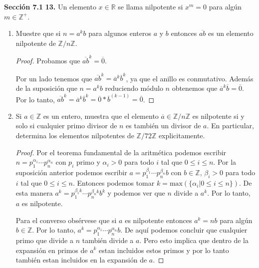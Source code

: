 \documentclass[letter,twoside,12pt]{article}
\begin{document}
\newpage
\textbf{Secci\'on 7.1} \textbf{13.} Un elemento $x \in \mathbb{R}$ se llama nilpotente si $x^m=0$ para alg\'un $m \in \mathbb{Z}^+$.
\begin{enumerate}[label=\textbf{(\alph*)}]

\item Muestre que si $n=a^kb$ para algunos enteros $a$ y $b$ entonces $\overline{ab}$ es un elemento nilpotente de $\mathbb{Z}/n\mathbb{Z}$.
\begin{proof}

Probamos que $\overline{ab}^k=\overline{0}$.

Por un lado tenemos que $\overline{ab}^k=\overline{a}^k\overline{b}^k$, ya que el anillo es conmutativo. Adem\'as de la suposici\'on que $n=a^kb$ reduciendo m\'odulo $n$ obtenemos que $\overline{a}^k\overline{b}=\overline{0}$. Por lo tanto, $\overline{ab}^k=\overline{a}^k\overline{b}^k=\overline{0}*\overline{b}^{(k-1)}= \overline{0}$.
\end{proof}
\item Si $a \in \mathbb{Z}$ es un entero, muestra que el elemento $\overline{a} \in \mathbb{Z}/n\mathbb{Z}$ es nilpotente si y solo si cualquier primo divisor de $n$ es tambi\'en un divisor de $a$. En particular, determina los elementos nilpotentes de $\mathbb{Z}/72\mathbb{Z}$ explicitamente.
\begin{proof}
Por el teorema fundamental de la aritm\'etica podemos escribir $n=p_1^{\alpha_1}\cdots p_n^{\alpha_n}$ con $p_i$ primo y $\alpha_i>0$ para todo $i$ tal que $0\leq i \leq n$. Por la suposici\'on anterior podemos escribir $a=p_1^{\beta_1}\cdots p_n^{\beta_n}b$ con $b\in \mathbb{Z}$, $\beta_i>0$ para todo $i$ tal que $0\leq i \leq n$. Entonces podemos tomar $k=\text{max}(\{\alpha_i|0\leq i \leq n\})$. De esta manera $a^k=p_1^{\beta_1k}\cdots p_n^{\beta_nk}b^k$ y podemos ver que $n$ divide a $a^k$. Por lo tanto, $a$ es nilpotente.

Para el converso obs\'ervese que si $a$ es nilpotente entonces $a^k=nb$ para alg\'un $b\in \mathbb{Z}$. Por lo tanto, $a^k=p_1^{\alpha_1}\cdots p_n^{\alpha_n}b$. De aqu\'i podemos concluir que cualquier primo que divide a $n$ tambi\'en divide a $a$. Pero esto implica que dentro de la expansi\'on en primos de $a^k$ estan incluidos estos primos y por lo tanto tambi\'en estan incluidos en la expansi\'on de $a$.


\end{proof}
\end{enumerate}
\end{document}
